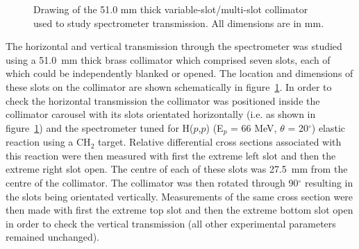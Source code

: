 \documentclass[11pt]{report}
\begin{document}
\begin{figure}
\centerline{\vspace{0cm}\hspace{0cm}
}
\centering
\caption{Drawing of the 51.0 mm thick variable-slot/multi-slot collimator used to study
spectrometer transmission. All dimensions are in mm.}
\label{fig:variable-slot-collimator}
\end{figure} 


The horizontal and vertical transmission through the spectrometer was
studied  using a 51.0~mm thick brass collimator 
which comprised seven slots, each of which could be 
independently blanked or
opened. The location and dimensions of these slots on the collimator
are shown schematically in figure~\ref{fig:variable-slot-collimator}.
In order to check the horizontal transmission the collimator was positioned
inside the collimator carousel with its  slots orientated 
horizontally (i.e. as shown in figure~\ref{fig:variable-slot-collimator}) and
the
spectrometer tuned for H($p$,$p$) (E$_{p}$ = 66 MeV, $\theta$ = 20$^{\circ}$)
elastic reaction using a CH$_{2}$ target.
Relative differential cross 
sections
associated with this
reaction were then measured with first the extreme left slot
and then the extreme right slot open. The centre of each of these slots
was 27.5~mm from the centre of the collimator. 
The collimator was then 
rotated through 90$^{\circ}$ resulting in the
slots being orientated vertically.
Measurements of the same cross section were then made with first the
extreme top slot and then the extreme bottom slot  open in order to check the 
vertical
transmission (all other experimental parameters 
remained unchanged).
\end{document}

